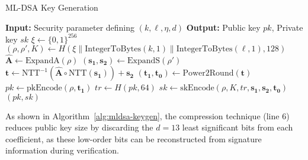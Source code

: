 \documentclass[journal=tches,final]{iacrtrans}
\newcommand{\Input}[1]{\STATE \textbf{Input:} #1}
\newcommand{\Output}[1]{\STATE \textbf{Output:} #1}
\begin{document}
\begin{algorithm}[h]
  \caption{ML-DSA Key Generation}
  \label{alg:mldsa-keygen}
  \begin{algorithmic}[1]
    \Input{Security parameter defining $(k, \ell, \eta, d)$}
    \Output{Public key $pk$, Private key $sk$}
    \STATE $\xi \leftarrow \{0,1\}^{256}$ 
    \STATE $(\rho, \rho', K) \leftarrow H(\xi \| \text{IntegerToBytes}(k,1) \| \text{IntegerToBytes}(\ell,1), 128)$
    \STATE $\hat{\mathbf{A}} \leftarrow \text{ExpandA}(\rho)$ 
    \STATE $(\mathbf{s_1}, \mathbf{s_2}) \leftarrow \text{ExpandS}(\rho')$ 
    \STATE $\mathbf{t} \leftarrow \text{NTT}^{-1}(\hat{\mathbf{A}} \circ \text{NTT}(\mathbf{s_1})) + \mathbf{s_2}$
    \STATE $(\mathbf{t_1}, \mathbf{t_0}) \leftarrow \text{Power2Round}(\mathbf{t})$ 
    \STATE $pk \leftarrow \text{pkEncode}(\rho, \mathbf{t_1})$
    \STATE $tr \leftarrow H(pk, 64)$
    \STATE $sk \leftarrow \text{skEncode}(\rho, K, tr, \mathbf{s_1}, \mathbf{s_2}, \mathbf{t_0})$
    \RETURN $(pk, sk)$
  \end{algorithmic}
\end{algorithm}

As shown in Algorithm~\ref{alg:mldsa-keygen}, the compression technique (line 6) reduces public key size by discarding the $d = 13$ least significant bits from each coefficient, as these low-order bits can be reconstructed from signature information during verification.
\end{document}
